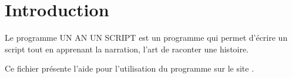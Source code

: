 \chapter{Introduction} %
\label{cha:introduction}

Le programme UN AN UN SCRIPT est un programme qui permet d'écrire un script tout en apprenant la narration, l'art de raconter une histoire.

Ce fichier présente l'aide pour l'utilisation du programme \unan{} sur le site \boa{}.

